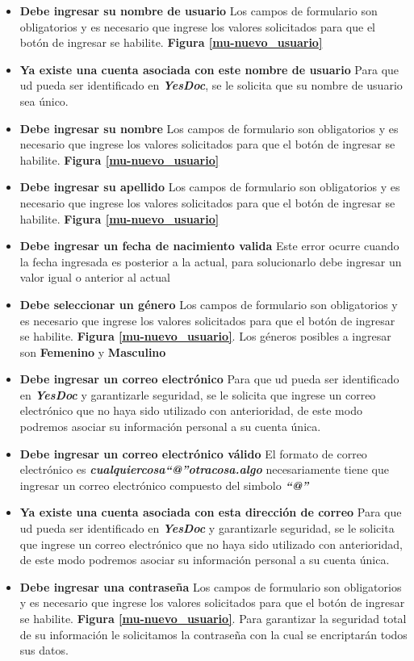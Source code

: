 \begin{itemize}
	\item \textbf{Debe ingresar su nombre de usuario}
	Los campos de formulario son obligatorios y es necesario que ingrese los valores solicitados para que el botón de ingresar se habilite.	\textbf{Figura \ref{mu-nuevo_usuario}}
	\item \textbf{Ya existe una cuenta asociada con este nombre de usuario}	
	Para que ud pueda ser identificado en \textbf{\textit{YesDoc}}, se le solicita que su nombre de usuario sea único.	
	\item \textbf{Debe ingresar su nombre}
	Los campos de formulario son obligatorios y es necesario que ingrese los valores solicitados para que el botón de ingresar se habilite.	\textbf{Figura \ref{mu-nuevo_usuario}}
	\item \textbf{Debe ingresar su apellido}
	Los campos de formulario son obligatorios y es necesario que ingrese los valores solicitados para que el botón de ingresar se habilite.	\textbf{Figura \ref{mu-nuevo_usuario}}
	\item \textbf{Debe ingresar un fecha de nacimiento valida}
Este error ocurre cuando la fecha ingresada es posterior a la actual, para solucionarlo debe ingresar un valor igual o anterior al actual
	\item \textbf{Debe seleccionar un género}
		Los campos de formulario son obligatorios y es necesario que ingrese los valores solicitados para que el botón de ingresar se habilite.	\textbf{Figura \ref{mu-nuevo_usuario}}. Los géneros posibles a ingresar son \textbf{Femenino} y \textbf{Masculino}
	\item \textbf{Debe ingresar un correo electrónico}
		Para que ud pueda ser identificado en \textbf{\textit{YesDoc}} y garantizarle seguridad, se le solicita que ingrese un correo electrónico que no haya sido utilizado con anterioridad, de este modo podremos asociar su información personal a su cuenta única.
	\item \textbf{Debe ingresar un correo electrónico válido}	
	El formato de correo electrónico  es \textbf{\textit{cualquiercosa``@''otracosa.algo}} necesariamente tiene que ingresar un correo electrónico compuesto del simbolo \textbf{\textit{``@''}}
	\item \textbf{Ya existe una cuenta asociada con esta dirección de correo}			
			Para que ud pueda ser identificado en \textbf{\textit{YesDoc}} y garantizarle seguridad, se le solicita que ingrese un correo electrónico que no haya sido utilizado con anterioridad, de este modo podremos asociar su información personal a su cuenta única.
	\item \textbf{Debe ingresar una contraseña}	
		Los campos de formulario son obligatorios y es necesario que ingrese los valores solicitados para que el botón de ingresar se habilite.	\textbf{Figura \ref{mu-nuevo_usuario}}. Para garantizar la seguridad total de su información le solicitamos la contraseña con la cual se encriptarán todos sus datos.
\end{itemize}
